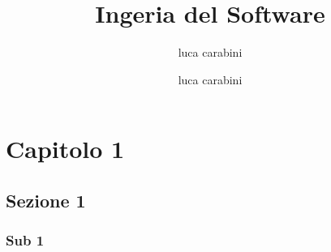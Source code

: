 \documentclass{report}%
\title{Ingeria del Software} \n \author{luca carabini}%
\author{luca carabini}%
\begin{document}
%
\normalsize%
\maketitle%
\tableofcontents%
\chapter{Capitolo 1}
\section{Sezione 1}
\subsection{Sub 1}
\end{document}
